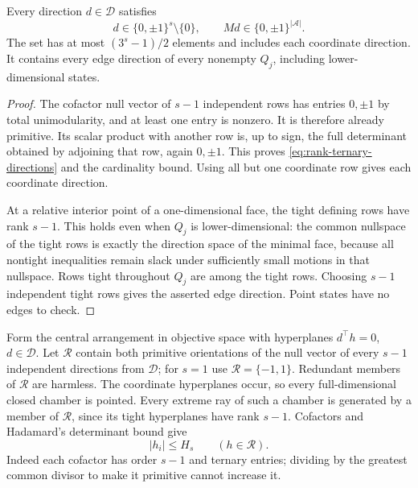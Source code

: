 \begin{lemma}\label{lem:rank-edges}
Every direction $d\in\mathcal D$ satisfies
\begin{equation}\label{eq:rank-ternary-directions}
 d\in\{0,\pm1\}^s\setminus\{0\},\qquad
                        Md\in\{0,\pm1\}^{|\mathcal A|}.
\end{equation}
The set has at most $(3^s-1)/2$ elements and includes each coordinate
direction. It contains every edge direction of every nonempty $Q_j$,
including lower-dimensional states.
\end{lemma}
\begin{proof}
The cofactor null vector of $s-1$ independent rows has entries $0,\pm1$
by total unimodularity, and at least one entry is nonzero. It is therefore
already primitive. Its scalar product with another row is, up to sign,
the full determinant obtained by adjoining that row, again $0,\pm1$.
This proves \eqref{eq:rank-ternary-directions} and the cardinality bound.
Using all but one coordinate row gives each coordinate direction.

At a relative interior point of a one-dimensional face, the tight
defining rows have rank $s-1$. This holds even when $Q_j$ is
lower-dimensional: the common nullspace of the tight rows is exactly the
direction space of the minimal face, because all nontight inequalities
remain slack under sufficiently small motions in that nullspace. Rows
tight throughout $Q_j$ are among the tight rows. Choosing $s-1$
independent tight rows gives the asserted edge direction. Point states
have no edges to check.
\end{proof}

Form the central arrangement in objective space with hyperplanes
$d^\top h=0$, $d\in\mathcal D$. Let $\mathcal R$ contain both
primitive orientations of the null vector of every $s-1$ independent
directions from $\mathcal D$; for $s=1$ use $\mathcal R=\{-1,1\}$.
Redundant members of $\mathcal R$ are harmless. The coordinate
hyperplanes occur, so every full-dimensional closed chamber is pointed.
Every extreme ray of such a chamber is generated by a member of
$\mathcal R$, since its tight hyperplanes have rank $s-1$.
Cofactors and Hadamard's determinant bound give
\begin{equation}\label{eq:rank-ray-bound}
 |h_i|\le H_s\qquad(h\in\mathcal R).
\end{equation}
Indeed each cofactor has order $s-1$ and ternary entries; dividing by
the greatest common divisor to make it primitive cannot increase it.

